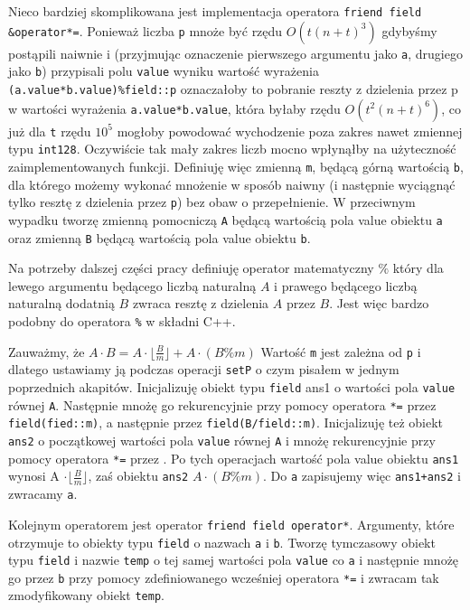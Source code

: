 \documentclass{article}
\begin{document}
Nieco bardziej skomplikowana jest implementacja operatora \texttt{friend field \&operator*=}. Ponieważ liczba 
\texttt{p} mnoże być rzędu $O(t(n+t)^3)$ gdybyśmy postąpili naiwnie i (przyjmując 
oznaczenie pierwszego argumentu jako \texttt{a}, drugiego jako \texttt{b}) 
przypisali polu \texttt{value} wyniku wartość wyrażenia
\texttt{(a.value*b.value)\%field::p} oznaczałoby to pobranie reszty z dzielenia przez p w 
wartości wyrażenia \texttt{a.value*b.value}, która 
byłaby rzędu $O(t^2(n+t)^6)$, co już dla \texttt{t} rzędu $10^5$ mogłoby powodować 
wychodzenie poza zakres nawet zmiennej typu
\texttt{\textunderscore \textunderscore int128}. 
Oczywiście tak mały zakres liczb mocno wpłynąłby na użyteczność
zaimplementowanych funkcji. Definiuję więc zmienną \texttt{m}, będącą 
górną wartością \texttt{b}, dla którego możemy wykonać mnożenie w sposób naiwny 
(i następnie wyciągnąć tylko resztę z dzielenia przez \texttt{p}) bez obaw o przepełnienie.
W przeciwnym wypadku tworzę zmienną pomocniczą \texttt{A} będącą wartością pola value
obiektu \texttt{a} oraz zmienną \texttt{B} będącą wartością pola value obiektu 
\texttt{b}.
\begin{tcolorbox}
\begin{center}
    Na potrzeby dalszej części pracy definiuję operator matematyczny $\%$ który dla lewego 
    argumentu będącego liczbą naturalną $A$ i prawego będącego liczbą naturalną dodatnią 
    $B$ zwraca resztę z dzielenia $A$ przez $B$. Jest więc bardzo podobny do operatora 
    \texttt{\%} w składni C++.
\end{center}    
\end{tcolorbox}
Zauważmy, że $A \cdot B = A \cdot \lfloor \frac{B}{m} \rfloor  + A \cdot (B \% m)$
Wartość \texttt{m} jest zależna od \texttt{p} i dlatego ustawiamy ją podczas operacji 
\texttt{setP} o czym pisałem w 
jednym poprzednich akapitów. Inicjalizuję obiekt typu \texttt{field} ans1 o wartości pola \texttt{value} równej \texttt{A}.
Następnie mnożę go rekurencyjnie przy pomocy operatora \texttt{*=} przez \texttt{field(fied::m)}, a następnie przez 
\texttt{field(B/field::m)}. Inicjalizuję też obiekt \texttt{ans2} o początkowej wartości pola \texttt{value}
równej \texttt{A} i mnożę rekurencyjnie przy pomocy operatora \texttt{*=} przez . 
Po tych operacjach wartość pola value obiektu \texttt{ans1} wynosi A $\cdot \lfloor \frac{B}{m} \rfloor$, zaś 
obiektu \texttt{ans2} $A \cdot (B \% m)$. Do \texttt{a} zapisujemy więc \texttt{ans1+ans2} i zwracamy \texttt{a}.


Kolejnym operatorem jest operator \texttt{friend field operator*}. Argumenty, które otrzymuje
to obiekty typu \texttt{field} o nazwach \texttt{a} i \texttt{b}. Tworzę tymczasowy obiekt typu \texttt{field} i nazwie \texttt{temp}
o tej samej wartości pola \texttt{value} co \texttt{a} i następnie mnożę go przez \texttt{b} przy pomocy
zdefiniowanego wcześniej operatora \texttt{*=} i zwracam tak zmodyfikowany obiekt \texttt{temp}.
\end{document}
